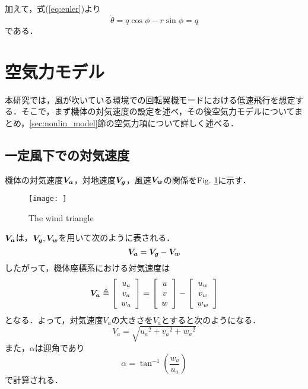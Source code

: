 加えて，式(\ref{eq:euler})より
\begin{equation}
  \dot{\theta} = q\cos\phi - r\sin\phi = q
\end{equation}
である．

\section{空気力モデル}
\label{sec:airf_model}

本研究では，風が吹いている環境での回転翼機モードにおける低速飛行を想定する．そこで，まず機体の対気速度の設定を述べ，その後空気力モデルについてまとめ，\ref{sec:nonlin_model}節の空気力項について詳しく述べる．

\subsection{一定風下での対気速度}
\label{sec:wind_speed}

機体の対気速度$\mbox{\boldmath $V_a$}$，対地速度$\mbox{\boldmath $V_g$}$，風速$\mbox{\boldmath $V_w$}$の関係をFig. \ref{fig:vel_air}に示す．

\begin{figure}[H]
\centering
\texttt{[image: ]}
\caption{The wind triangle}
\label{fig:vel_air}
\end{figure}

$\mbox{\boldmath $V_a$}$は，$\mbox{\boldmath $V_g$},\mbox{\boldmath $V_w$}$を用いて次のように表される．
\begin{equation}
  \mbox{\boldmath $V_a$} = \mbox{\boldmath $V_g$} - \mbox{\boldmath $V_w$}
\end{equation}
したがって，機体座標系における対気速度は
\begin{equation}
  \mbox{\boldmath $V_a$} \triangleq
  \left[
    \begin{array}{ccc}
      u_a \\
      v_a \\
      w_a
    \end{array}
  \right] =
  \left[
    \begin{array}{ccc}
      u \\
      v \\
      w \\
    \end{array}
  \right] -
  \left[
    \begin{array}{ccc}
      u_w \\
      v_w \\
      w_w
    \end{array}
  \right]
\end{equation}
となる．よって，対気速度\mbox{\boldmath $V_a$}の大きさを$V_a$とすると次のようになる．
\begin{equation}
  V_a = \sqrt{{u_a}^2+{v_a}^2+{w_a}^2}
\end{equation}
また，$\alpha$は迎角であり
\begin{equation}
  \alpha = \tan^{-1}\left(\dfrac{w_a}{u_a}\right)
\end{equation}
で計算される．

